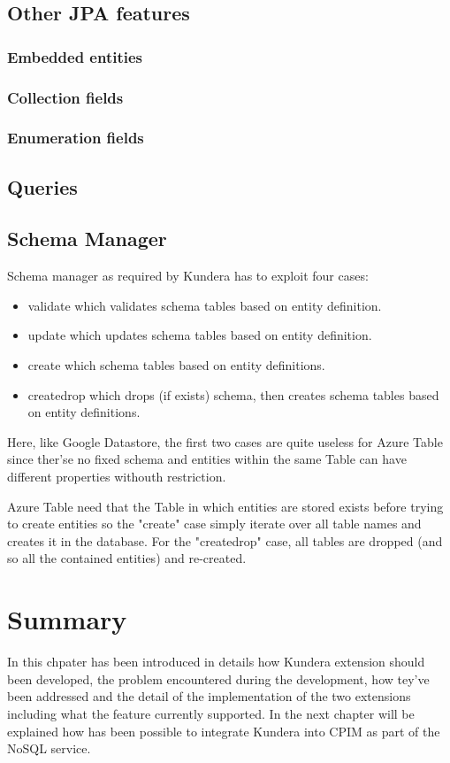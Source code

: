 \subsection{Other JPA features}

\subsubsection{Embedded entities}

\subsubsection{Collection fields}

\subsubsection{Enumeration fields}

\subsection{Queries}

\subsection{Schema Manager}
Schema manager as required by Kundera has to exploit four cases:
\begin{itemize}
\item validate which validates schema tables based on entity definition.
\item update which updates schema tables based on entity definition.
\item create which schema tables based on entity definitions.
\item create\textunderscore drop which drops (if exists) schema, then creates schema tables based on entity definitions.
\end{itemize}
Here, like Google Datastore, the first two cases are quite useless for Azure Table since ther'se no fixed schema and entities within the same Table can have different properties withouth restriction.

Azure Table need that the Table in which entities are stored exists before trying to create entities so the "create" case simply iterate over all table names and creates it in the database. 
For the "create\textunderscore drop" case, all tables are dropped (and so all the contained entities) and re-created.

\section{Summary}
In this chpater has been introduced in details how Kundera extension should been developed, the problem encountered during the development, how tey've been addressed and the detail of the implementation of the two extensions including what the feature currently supported.
In the next chapter will be explained how has been possible to integrate Kundera into CPIM as part of the NoSQL service.
